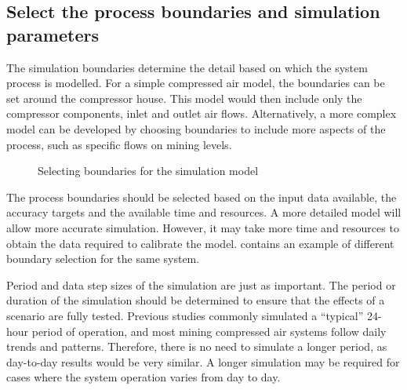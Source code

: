 	\subsection{Select the process boundaries and simulation parameters}
	The simulation boundaries determine the detail based on which the system process is modelled. For a simple compressed air model, the boundaries can be set around the compressor house. This model would then include only the compressor components, inlet and outlet air flows. Alternatively, a more complex model can be developed by choosing boundaries to include more aspects of the process, such as specific flows on mining levels.\par 
	 \begin{figure}[h]
	 	\centering
	 	\caption{Selecting boundaries for the simulation model}
	 	\label{fig: Sensitivity}
	 \end{figure}
 \clearpage
	The process boundaries should be selected based on the input data available, the accuracy targets and the available time and resources. A more detailed model will allow more accurate simulation. However, it may take more time and resources to obtain the data required to calibrate the model.  contains an example of different boundary selection for the same system.
	\par
	Period and data step sizes of the simulation are just as important. The period or duration of the simulation should be determined to ensure that the effects of a scenario are fully tested. Previous studies commonly simulated a \enquote{typical} 24-hour period of operation, and most mining compressed air systems follow daily trends and patterns. Therefore, there is no need to simulate a longer period, as day-to-day results would be very similar. A longer simulation may be required for cases where the system operation varies from day to day.

